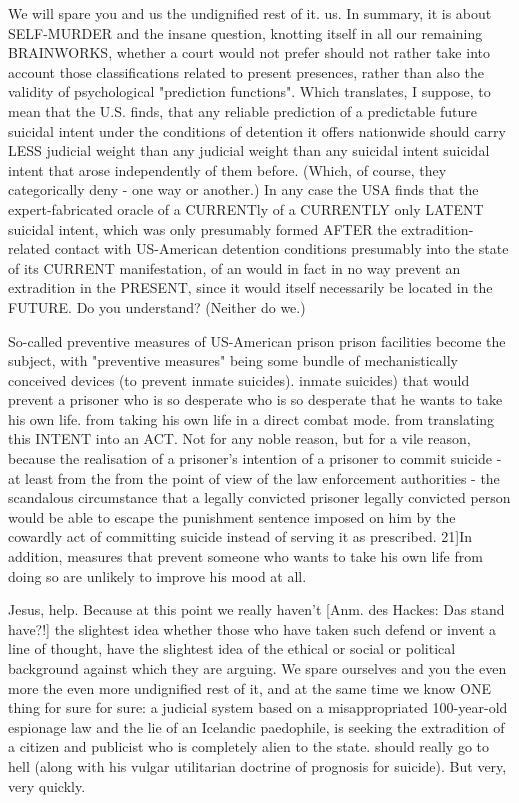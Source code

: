 \begin{multicols}{2}
We will spare you and us the undignified rest of it.
us. In summary, it is about SELF-MURDER and
the insane question, knotting itself in all our remaining BRAINWORKS, whether a court would not prefer
should not rather take into account those classifications related to present presences, rather than also the validity of
psychological "prediction functions". Which translates, I suppose, to mean that the U.S. finds,
that any reliable prediction of a predictable
future suicidal intent under the conditions of detention it offers nationwide should carry LESS judicial weight than any
judicial weight than any suicidal intent
suicidal intent that arose independently of them before. (Which, of course, they categorically deny - one way or another.) In any case
the USA finds that the expert-fabricated oracle of a CURRENTly
of a CURRENTLY only LATENT suicidal intent,
which was only presumably formed AFTER the extradition-related contact
with US-American detention conditions presumably
into the state of its CURRENT manifestation, of an
would in fact in no way prevent an extradition in the PRESENT, since it would itself necessarily be located in the FUTURE. Do you understand?
(Neither do we.)

So-called preventive measures of US-American prison
prison facilities become the subject, with "preventive measures" being some bundle of mechanistically conceived devices (to prevent inmate suicides).
inmate suicides) that would prevent a prisoner who is so desperate
who is so desperate that he wants to take his own life.
from taking his own life in a direct combat mode.
from translating this INTENT into an ACT.
Not for any noble reason, but for a vile reason, because the realisation of a prisoner's
intention of a prisoner to commit suicide - at least from the
from the point of view of the law enforcement authorities - the
scandalous circumstance that a legally convicted prisoner
legally convicted person would be able to escape the punishment
sentence imposed on him by the cowardly act of committing suicide instead of serving it as prescribed. 
21]{In addition, measures that prevent someone who wants to take his own life from doing so are unlikely to improve his mood at all}.

Jesus, help. Because at this point we really
haven't [Anm. des Hackes: Das stand have?!] the slightest idea whether those who have taken such
defend or invent a line of thought, have the slightest idea of the ethical or social or political background against which they are arguing.
We spare ourselves and you the even more the even more undignified rest of it, and at the same time we know ONE thing for sure
for sure: a judicial system based on a misappropriated 100-year-old espionage law
and the lie of an Icelandic paedophile, is seeking the extradition of a citizen and publicist who is completely alien to the state.
should really go to hell (along with his vulgar utilitarian doctrine of prognosis for suicide). But very, very
quickly.


\end{multicols}
